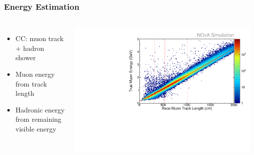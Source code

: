 \documentclass[10pt,professionalfonts,xcolor=table]{beamer}
\begin{document}
\begin{frame}
\frametitle{Energy Estimation}
\begin{columns}[c]
  \begin{itemize}
  \item \numu CC: muon track + hadron shower
  \gap
  \item Muon energy from track length
  \gap
  \item Hadronic energy from remaining visible energy

  \end{itemize}

\centering

\includegraphics[height=\textwidth, angle=-90]{figures/plots/reco/numu_energy_muon_fit.pdf}


\end{columns}
\end{frame}
\end{document}
